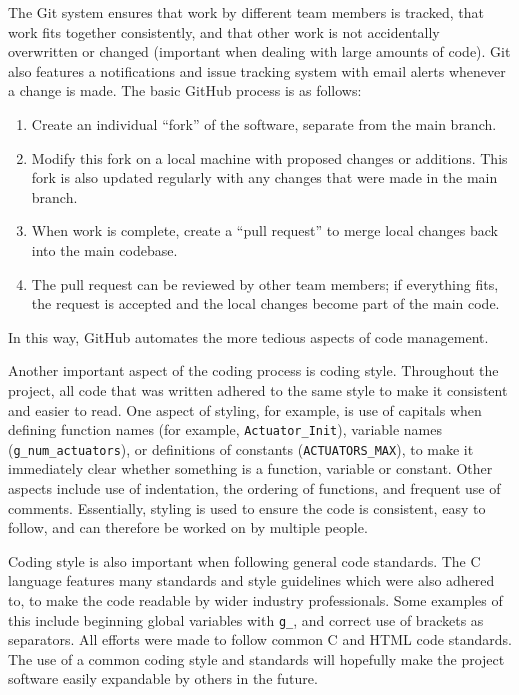 The Git system ensures that work by different team members is tracked, that work fits together consistently, and that other work is not accidentally overwritten or changed (important when dealing with large amounts of code). Git also features a notifications and issue tracking system with email alerts whenever a change is made. The basic GitHub process is as follows:

\begin{enumerate}
	\item Create an individual ``fork'' of the software, separate from the main branch.
	\item Modify this fork on a local machine with proposed changes or additions. This fork is also updated regularly with any changes that were made in the main branch.
	\item When work is complete, create a ``pull request'' to merge local changes back into the main codebase.
	\item The pull request can be reviewed by other team members; if everything fits, the request is accepted and the local changes become part of the main code. 
\end{enumerate}
In this way, GitHub automates the more tedious aspects of code management.

Another important aspect of the coding process is coding style. Throughout the project, all code that was written adhered to the same style to make it consistent and easier to read. One aspect of styling, for example, is use of capitals when defining function names (for example, \verb/Actuator_Init/), variable names (\verb/g_num_actuators/), or definitions of constants (\verb/ACTUATORS_MAX/), to make it immediately clear whether something is a function, variable or constant. Other aspects include use of indentation, the ordering of functions, and frequent use of comments. Essentially, styling is used to ensure the code is consistent, easy to follow, and can therefore be worked on by multiple people. 

Coding style is also important when following general code standards. The C language features many standards and style guidelines which were also adhered to, to make the code readable by wider industry professionals. Some examples of this include beginning global variables with \verb/g_/, and correct use of brackets as separators\cite{mellon}. All efforts were made to follow common C and HTML code standards. The use of a common coding style and standards will hopefully make the project software easily expandable by others in the future.


